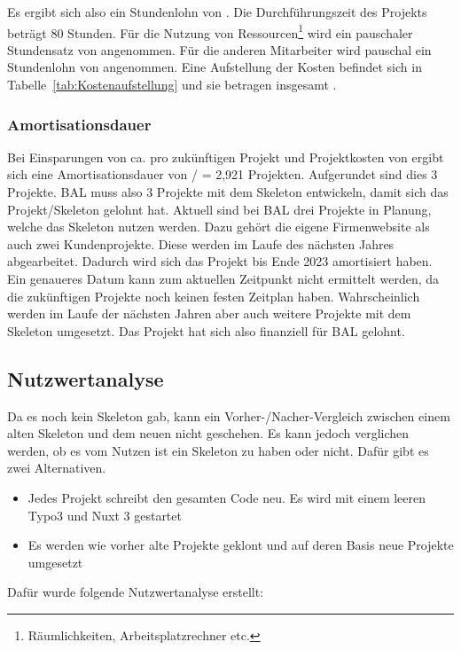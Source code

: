 Es ergibt sich also ein Stundenlohn von . 
Die Durchführungszeit des Projekts beträgt 80 Stunden. Für die Nutzung von Ressourcen\footnote{Räumlichkeiten, Arbeitsplatzrechner etc.} wird 
ein pauschaler Stundensatz von  angenommen. Für die anderen Mitarbeiter wird pauschal ein Stundenlohn von  angenommen. 
Eine Aufstellung der Kosten befindet sich in Tabelle~\ref{tab:Kostenaufstellung} und sie betragen insgesamt .


\subsubsection{Amortisationsdauer}
\label{sec:Amortisationsdauer}

Bei Einsparungen von ca.  pro zukünftigen Projekt und Projektkosten von  ergibt sich eine Amortisationsdauer von  /  = 2,921 Projekten. Aufgerundet sind dies 3 Projekte. \acs{BAL} muss also 3 Projekte mit dem Skeleton entwickeln, damit sich das Projekt/Skeleton gelohnt hat. Aktuell sind bei \acs{BAL} drei Projekte in Planung, welche das Skeleton nutzen werden. Dazu gehört die eigene Firmenwebsite als auch zwei Kundenprojekte. Diese werden im Laufe des nächsten Jahres abgearbeitet. Dadurch wird sich das Projekt bis Ende 2023 amortisiert haben. Ein genaueres Datum kann zum aktuellen Zeitpunkt nicht ermittelt werden, da die zukünftigen Projekte noch keinen festen Zeitplan haben. Wahrscheinlich werden im Laufe der nächsten Jahren aber auch weitere Projekte mit dem Skeleton umgesetzt. Das Projekt hat sich also finanziell für \acs{BAL} gelohnt.


\subsection{Nutzwertanalyse}
\label{sec:Nutzwertanalyse}
Da es noch kein Skeleton gab, kann ein Vorher-/Nacher-Vergleich zwischen einem alten Skeleton und dem neuen nicht geschehen. Es kann jedoch verglichen werden, ob es vom Nutzen ist ein Skeleton zu haben oder nicht. Dafür gibt es zwei Alternativen.
\begin{itemize}
	\item Jedes Projekt schreibt den gesamten Code neu. Es wird mit einem leeren Typo3 und Nuxt 3 gestartet
	\item Es werden wie vorher alte Projekte geklont und auf deren Basis neue Projekte umgesetzt
\end{itemize}
Dafür wurde folgende Nutzwertanalyse erstellt: \newline


